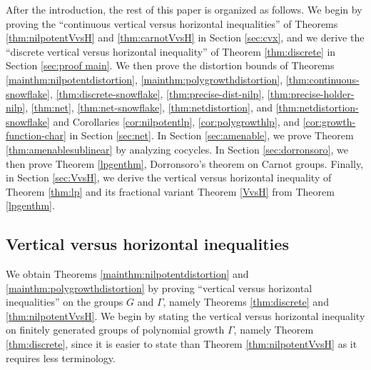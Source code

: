 \documentclass[11pt,reqno]{amsart}
\newcommand{\1}{\mathbf 1}
\begin{document}
After the introduction, the rest of this paper is organized as follows. We begin by proving the ``continuous vertical versus horizontal inequalities'' of Theorems \ref{thm:nilpotentVvsH} and \ref{thm:carnotVvsH} in Section \ref{sec:cvx}, and we derive the ``discrete vertical versus horizontal inequality'' of Theorem \ref{thm:discrete} in Section \ref{sec:proof main}. We then prove the distortion bounds of Theorems \ref{mainthm:nilpotentdistortion}, \ref{mainthm:polygrowthdistortion}, \ref{thm:continuous-snowflake}, \ref{thm:discrete-snowflake}, \ref{thm:precise-dist-nilp}, \ref{thm:precise-holder-nilp}, \ref{thm:net}, \ref{thm:net-snowflake}, \ref{thm:netdistortion}, and \ref{thm:netdistortion-snowflake} and Corollaries \ref{cor:nilpotentlp}, \ref{cor:polygrowthlp}, and \ref{cor:growth-function-char} in Section \ref{sec:net}. In Section \ref{sec:amenable}, we prove Theorem \ref{thm:amenablesublinear} by analyzing cocycles. In Section \ref{sec:dorronsoro}, we then prove Theorem \ref{lpgenthm}, Dorronsoro's theorem on Carnot groups. Finally, in Section \ref{sec:VvsH}, we derive the vertical versus horizontal inequality of Theorem \ref{thm:lp} and its fractional variant Theorem \ref{VvsH} from Theorem \ref{lpgenthm}.



\subsection{Vertical versus horizontal inequalities}\label{subsec:VvsH}

We obtain Theorems \ref{mainthm:nilpotentdistortion} and \ref{mainthm:polygrowthdistortion} by proving ``vertical versus horizontal inequalities'' on the groups $G$ and $\Gamma$, namely Theorems \ref{thm:discrete} and \ref{thm:nilpotentVvsH}. We begin by stating the vertical versus horizontal inequality on finitely generated groups of polynomial growth $\Gamma$, namely Theorem \ref{thm:discrete}, since it is easier to state than Theorem \ref{thm:nilpotentVvsH} as it requires less terminology.
\end{document}
